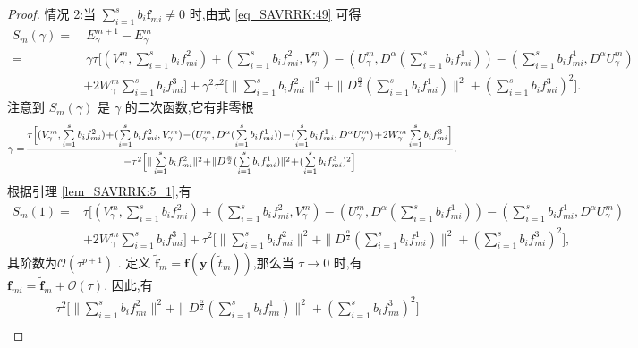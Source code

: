 \begin{proof}
情况 2:当 $\sum\limits_{i=1}^s b_i \bm{f}_{m i} \neq 0$ 时,由式 \eqref{eq_SAVRRK:49} 可得
\begin{align}\label{eq_SAVRRK:5_4a}
	S_m(\gamma)=&~E_{\gamma}^{m+1}-E_{\gamma}^{m}\nonumber\\
	=&~\gamma\tau\Big[(V_{\gamma}^{m},\sum\limits_{i=1}^{s}b_if_{mi}^2)+(\sum\limits_{i=1}^{s}b_if_{mi}^2,V_{\gamma}^{m})-(U_{\gamma}^{m},D^{\alpha} (\sum\limits_{i=1}^{s}b_if_{mi}^1))-(\sum\limits_{i=1}^{s}b_if_{mi}^1, D^{\alpha} U_{\gamma}^{m})\nonumber\\
	&+2W_{\gamma}^{m}\sum\limits_{i=1}^{s}b_if_{mi}^3\Big]+\gamma^2\tau^2\Big[\|\sum\limits_{i=1}^{s}b_if_{mi}^2\|^2+ \|D^\frac{\alpha}{2}(\sum\limits_{i=1}^{s}b_if_{mi}^1)\|^2+(\sum\limits_{i=1}^{s}b_if_{mi}^3)^2\Big].
\end{align}
注意到 $S_m(\gamma)$ 是 $\gamma$ 的二次函数,它有非零根
\begin{equation}\label{eq_SAVRRK:5_4a3}\small
	\gamma=\!\frac{\tau\Big[(V_{\gamma}^{m},\sum\limits_{i=1}^{s}b_if_{mi}^2)\!+\!(\sum\limits_{i=1}^{s}b_if_{mi}^2,V_{\gamma}^{m})\!-\!(U_{\gamma}^{m},D^{\alpha} (\sum\limits_{i=1}^{s}b_if_{mi}^1))\!-\!(\sum\limits_{i=1}^{s}b_if_{mi}^1, D^{\alpha} U_{\gamma}^{m})\!+\!2W_{\gamma}^{m}\sum\limits_{i=1}^{s}b_if_{mi}^3\Big]}{-\tau^2\Big[\|\sum\limits_{i=1}^{s}b_if_{mi}^2\|^2\!+\! \|D^\frac{\alpha}{2}(\sum\limits_{i=1}^{s}b_if_{mi}^1)\|^2\!+\!(\sum\limits_{i=1}^{s}b_if_{mi}^3)^2\Big]}.
\end{equation}
根据引理 \ref{lem_SAVRRK:5_1},有
\begin{align}\label{eq_SAVRRK:5_4a2}
	S_m(1)=&\tau\Big[(V_{\gamma}^{m},\sum\limits_{i=1}^{s}b_if_{mi}^2)+(\sum\limits_{i=1}^{s}b_if_{mi}^2,V_{\gamma}^{m})-(U_{\gamma}^{m},D^{\alpha} (\sum\limits_{i=1}^{s}b_if_{mi}^1))-(\sum\limits_{i=1}^{s}b_if_{mi}^1, D^{\alpha} U_{\gamma}^{m})\nonumber\\
	&+2W_{\gamma}^{m}\sum\limits_{i=1}^{s}b_if_{mi}^3\Big]+\tau^2\Big[\|\sum\limits_{i=1}^{s}b_if_{mi}^2\|^2+ \|D^\frac{\alpha}{2}(\sum\limits_{i=1}^{s}b_if_{mi}^1)\|^2+(\sum\limits_{i=1}^{s}b_if_{mi}^3)^2\Big],
\end{align}
其阶数为$\mathcal{O}(\tau^{p+1})$ .
定义 $\tilde{\bm{f}}_m=\bm{f}\left(\bm{y}\left(\tilde{t}_m\right)\right)$,那么当 $\tau\rightarrow 0$ 时,有 $\bm{f}_{m i}=\tilde{\bm{f}}_m+\mathcal{O}(\tau)$.
因此,有
\begin{align}\label{eq_SAVRRK:5_4a4}
	&\tau^2\Big[\|\sum\limits_{i=1}^{s}b_if_{mi}^2\|^2+ \|D^\frac{\alpha}{2}(\sum\limits_{i=1}^{s}b_if_{mi}^1)\|^2+(\sum\limits_{i=1}^{s}b_if_{mi}^3)^2\Big]\nonumber\\

\end{align}
\end{proof}
